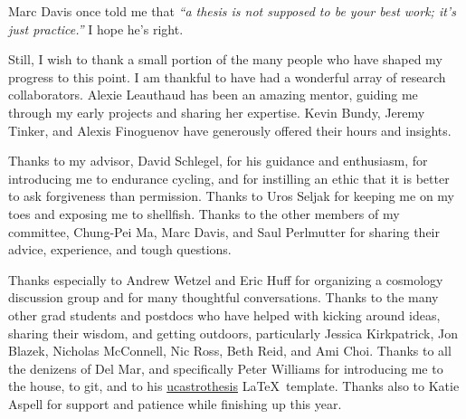 \documentclass[12pt]{myucthesis}
\begin{document}
\hypersetup{pageanchor=true}
\begin{frontmatter}


\tableofcontents


\begin{acknowledgements}

Marc Davis once told me that \textit{``a thesis is not supposed to be your
best work; it's just practice.''} I hope he's right.

Still, I wish to thank a small portion of the many people who have
shaped my progress to this point. I am thankful to have had a
wonderful array of research collaborators. Alexie Leauthaud has been
an amazing mentor, guiding me through my early projects and sharing
her expertise. Kevin Bundy, Jeremy Tinker, and Alexis Finoguenov have
generously offered their hours and insights.

Thanks to my advisor, David Schlegel, for his guidance and enthusiasm,
for introducing me to endurance cycling, and for instilling an ethic
that it is better to ask forgiveness than permission. Thanks to Uros
Seljak for keeping me on my toes and exposing me to shellfish.  Thanks
to the other members of my committee, Chung-Pei Ma, Marc Davis,
and Saul Perlmutter for sharing their advice, experience, and tough
questions.

Thanks especially to Andrew Wetzel and Eric Huff for organizing a
cosmology discussion group and for many thoughtful conversations.
Thanks to the many other grad students and postdocs who have helped
with kicking around ideas, sharing their wisdom, and getting
outdoors, particularly Jessica Kirkpatrick, Jon Blazek, Nicholas
McConnell, Nic Ross, Beth Reid, and Ami Choi. Thanks to all the
denizens of Del Mar, and specifically Peter Williams for introducing me to
the house, to git, and to his
\href{https://github.com/pkgw/ucastrothesis}{\textsf{ucastrothesis}}
\LaTeX\ template. Thanks also to Katie Aspell for support and patience
while finishing up this year.


\end{acknowledgements}
\end{frontmatter}
\end{document}
